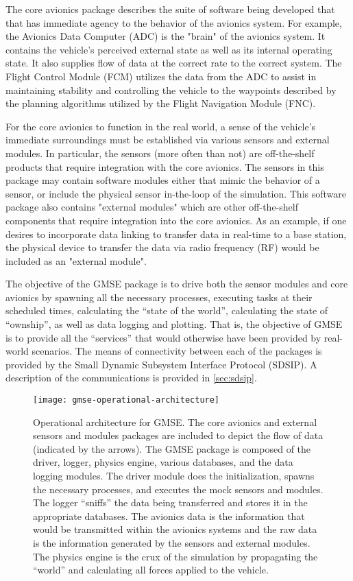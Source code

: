 The core avionics package describes the suite of software being developed that that has immediate
agency to the behavior of the avionics system. For example, the Avionics Data Computer (ADC) is the
"brain" of the avionics system. It contains the vehicle's perceived external state as well as its
internal operating state. It also supplies flow of data at the correct rate to the correct system.
The Flight Control Module (FCM) utilizes the data from the ADC to assist in maintaining stability
and controlling the vehicle to the waypoints described by the planning algorithms utilized by the
Flight Navigation Module (FNC).

For the core avionics to function in the real world, a sense of the vehicle's immediate surroundings
must be established via various sensors and external modules. In particular, the sensors (more often
than not) are off-the-shelf products that require integration with the core avionics. The sensors in
this package may contain software modules either that mimic the behavior of a sensor, or include the
physical sensor in-the-loop of the simulation. This software package also contains "external
modules" which are other off-the-shelf components that require integration into the core avionics.
As an example, if one desires to incorporate data linking to transfer data in real-time to a base
station, the physical device to transfer the data via radio frequency (RF) would be included as an
"external module".

The objective of the GMSE package is to drive both the sensor modules and core avionics by spawning
all the necessary processes, executing tasks at their scheduled times, calculating the ``state of
the world'', calculating the state of ``ownship'', as well as data logging and plotting. That is,
the objective of GMSE is to provide all the ``services'' that would otherwise have been provided by
real-world scenarios. The means of connectivity between each of the packages is provided by the
Small Dynamic Subsystem Interface Protocol (SDSIP). A description of the communications is provided
in \autoref{sec:sdsip}.

\begin{figure*}[ht]
  \texttt{[image: gmse-operational-architecture]}
  \caption{Operational architecture for GMSE. The core avionics and external sensors and modules
  packages are included to depict the flow of data (indicated by the arrows). The GMSE package is
  composed of the driver, logger, physics engine, various databases, and the data logging modules.
  The driver module does the initialization, spawns the necessary processes, and executes the mock
  sensors and modules. The logger ``sniffs'' the data being transferred and stores it in the
  appropriate databases. The avionics data is the information that would be transmitted within the
  avionics systems and the raw data is the information generated by the sensors and external
  modules. The physics engine is the crux of the simulation by propagating the ``world'' and
  calculating all forces applied to the vehicle.}
  \label{fig:gmse-operational-architecture}
\end{figure*}

